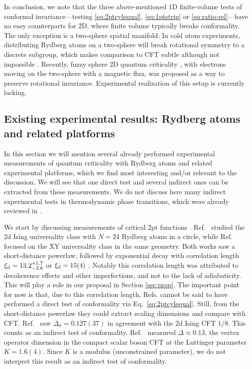 \documentclass[a4paper,12pt]{article}
\theoremstyle{remark}
\theoremstyle{theorem}
\begin{document}
In conclusion, we note that the three above-mentioned 1D finite-volume tests
of conformal invariance---testing \eqref{eq:2ptcylequal}, \eqref{eq:1ptstrip}
or \eqref{eq:ratio-rel}---have no easy counterparts for 2D, where finite
volume typically breaks conformality. The only exception is a two-sphere
spatial manifold. In cold atom experiments, distributing Rydberg atoms on a
two-sphere will break rotational symmetry to a discrete subgroup, which makes
comparison to CFT subtle although not impossible
{\cite{Lao:2023zis,Wu:2026ayb}}. Recently, fuzzy sphere 2D quantum criticality
{\cite{Zhu:2022gjc}}, with electrons moving on the two-sphere with a magnetic
flux, was proposed as a way to preserve rotational invariance. Experimental
realization of this setup is currently lacking.

\subsection{Existing experimental results: Rydberg atoms and related
	platforms}

In this section we will mention several already performed experimental
measurements of quantum criticality with Rydberg atoms and related
experimental platforms, which we find most interesting and/or relevant to the discussion. We will see that one
direct test and several indirect ones can be extracted from these
measurements. We do not discuss here many indirect experimental tests in
thermodynamic phase transitions, which were already reviewed in
{\cite{Henkel1999,Rychkov:2025zks}}.

We start by discussing measurements of critical 2pt functions
{\cite{Fang:2024uyf,Emperauger:2025raf}}. Ref.~{\cite{Fang:2024uyf}} studied
the 2d Ising universality class with $N = 24$ Rydberg atoms in a circle, while
Ref.~{\cite{Emperauger:2025raf}} focused on the XY universality class in the
same geometry. Both works saw a short-distance powerlaw, followed by
exponential decay with correlation length $\xi_{\rm d} = 13.2^{+ 5.7}_{- 3.6}$
{\cite{Fang:2024uyf}} or $\xi_{\rm d} = 15 (4)$ {\cite{Emperauger:2025raf}}. Notably
this correlation length was attributed to decoherence effects and other
imperfections, and not to the lack of adiabaticity. This will play a role in
our proposal in Section \ref{sec:prop}. The important point for now is that, due to this correlation length,
Refs. {\cite{Fang:2024uyf,Emperauger:2025raf}} cannot be said to have
performed a direct test of conformality via Eq.~\eqref{eq:2ptcylequal}. Still,
from the short-distance powerlaw they could extract scaling dimensions and compare
with CFT. Ref.~{\cite{Fang:2024uyf}} saw $\Delta_{\sigma} = 0.127 (37)$ in
agreement with the 2d Ising CFT $1 / 8$. This counts as an indirect test of
conformality. Ref.~{\cite{Emperauger:2025raf}} measured $\Delta \approx 0.13$,
the vertex operator dimension in the compact scalar boson CFT at the Luttinger
parameter $K = 1.6 (4)$. Since $K$ is a modulus (unconstrained parameter), we
do not interpret this result as an indirect test of conformality.
\end{document}
